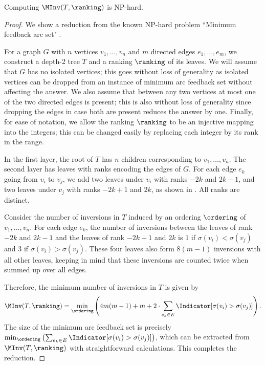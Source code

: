 \begin{proposition}
    Computing $\MInv(T,\ranking)$ is NP-hard.
\end{proposition}

\begin{proof}
%
%
%
%
%
%
%
    We show a reduction from the known NP-hard problem ``Minimum feedback arc set" \cite{Karp1972}.

    For a graph $G$ with $n$ vertices $v_1,\dots,v_n$ and $m$ directed edges $e_1,\dots,e_m$, we construct a depth-2 tree $T$ and a ranking $\ranking$ of its leaves. We will assume that $G$ has no isolated vertices; this goes without loss of generality as isolated vertices can be dropped from an instance of minimum arc feedback set without affecting the answer. We also assume that between any two vertices at most one of the two directed edges is present; this is also without loss of generality since dropping the edges in case both are present reduces the answer by one. Finally, for ease of notation, we allow the ranking $\ranking$ to be an injective mapping into the integers; this can be changed easily by replacing each integer by its rank in the range.
        
    In the first layer, the root of $T$ has $n$ children corresponding to $v_1,\dots,v_n$. The second layer has leaves with ranks encoding the edges of $G$. For each edge $e_k$ going from $v_i$ to $v_j$, we add two leaves under $v_i$ with ranks $-2k$ and $2k-1$, and two leaves under $v_j$ with ranks $-2k+1$ and $2k$, as shown in . All ranks are distinct.
    
    Consider the number of inversions in $T$ induced by an ordering $\ordering$ of $v_1,\dots,v_n$. For each edge $e_k$, the number of inversions between the leaves of rank $-2k$ and $2k-1$ and the leaves of rank $-2k+1$ and $2k$ is $1$ if $\sigma(v_i)<\sigma(v_j)$ and $3$ if $\sigma(v_i)>\sigma(v_j)$. These four leaves also form $8(m-1)$ inversions with all other leaves, keeping in mind that these inversions are counted twice when summed up over all edges.
    
    Therefore, the minimum number of inversions in $T$ is given by
    \begin{equation*}
        \MInv(T,\ranking)=\min_{\ordering} \left(4m(m-1)+m+ 2\cdot\sum_{e_k\in E}\Indicator[\sigma(v_i)>\sigma(v_j)]\right).
    \end{equation*}
    The size of the minimum arc feedback set is precisely $\min_{\ordering} \left( \sum_{e_k\in E}\Indicator[\sigma(v_i)>\sigma(v_j)] \right)$, which can be extracted from $\MInv(T,\ranking)$ with straightforward calculations. This completes the reduction.
\end{proof}


